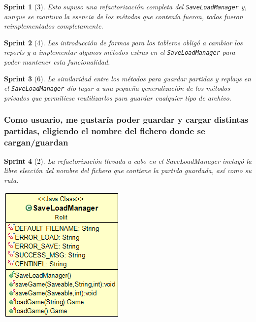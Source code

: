 \documentclass[12pt,a4paper,openright]{book}
\theoremstyle{break}
\newtheorem*{sprint}{Sprint}
\begin{document}
\begin{sprint}[3]
Esto supuso una refactorización completa del \texttt{SaveLoadManager} y, aunque se mantuvo la esencia de los métodos que contenía fueron, todos fueron reimplementados completamente.

\end{sprint}

\begin{sprint}[4]
Las introducción de formas para los tableros obligó a cambiar los reports y a implementar algunos métodos extras en el \texttt{SaveLoadManager} para poder mantener esta funcionalidad.
\end{sprint}

\begin{sprint}[6]
La similaridad entre los métodos para guardar partidas y \textit{replays} en el \texttt{SaveLoadManager} dio lugar a una pequeña generalización de los métodos privados que permitiese reutilizarlos para guardar cualquier tipo de archivo.
\end{sprint}

\subsubsection{Como usuario, me gustaría poder guardar y cargar distintas partidas, eligiendo el nombre del fichero donde se cargan/guardan}
\begin{sprint}[2]
La refactorización llevada a cabo en el SaveLoadManager incluyó la libre elección del nombre del fichero que contiene la partida guardada, así como su ruta.

\begin{center}
\centering
\includegraphics[scale=0.5]{save-load-manager-sprint2.png}
\end{center}

\end{sprint}
\end{document}
